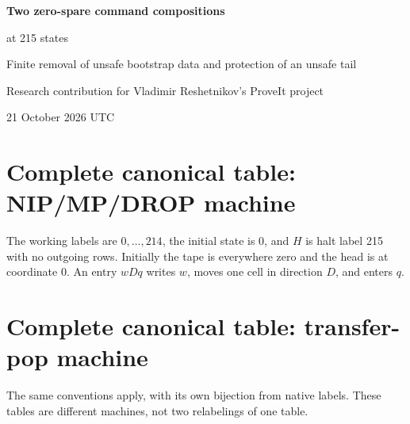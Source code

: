 \documentclass[11pt]{article}
\begin{document}
\begin{center}
{\LARGE\bfseries Two zero-spare command compositions\par at 215 states}\par\vspace{8pt}
{\large Finite removal of unsafe bootstrap data and protection of an unsafe tail}\par\vspace{5pt}
{Research contribution for Vladimir Reshetnikov's ProveIt project}\par
{21 October 2026 UTC}
\end{center}
\begin{abstract}
We construct two materially different binary, single-tape, blank-start machines with 215 working states. Neither is a 214-state result. Both combine the recently published zero-valued spare allocator with a different command language and a new initialization proof. The numerical calculus and its ZFC calibration are explicitly inherited.

The first machine uses command order NIP/MP/DROP. Its first complete source frame is \emph{unsafe}: finite initialization temporarily places the falsity code in both active theorem registers. Rather than asserting an invalid invariant there, we verify a further finite prefix. Failed numerical detachment removes the unsafe data, and after 570,263 binary transitions the machine reaches an ordinary safe root with next-candidate index 5 and additive counter 1. An arbitrary-counter calibration theorem then applies.

The second uses the three-command transfer-pop language. After 73,172 transitions it reaches a rigorously matched interior AX frame. Completing that AX leaves eight theorem heads above a generalization code not established to be a theorem. We do not call that code a theorem: an unbounded credit theorem bounds all future stack debt by three, permanently protecting the arbitrary suffix below at least five theorem heads. The two distinct initialization arguments are accompanied by full arbitrary-natural primitive runtime proofs and exact literal tables. These are ordinary mathematical proofs formalizable in ZFC, with executable certificates, not new Lean/Rocq kernel endpoints or claims of minimum state count.
\end{abstract}
\setcounter{tocdepth}{1}\tableofcontents





\clearpage\appendix
\section{Complete canonical table: NIP/MP/DROP machine}
The working labels are $0,\ldots,214$, the initial state is 0, and $H$ is halt label 215 with no outgoing rows. Initially the tape is everywhere zero and the head is at coordinate 0. An entry $wDq$ writes $w$, moves one cell in direction $D$, and enters $q$.

\clearpage
\section{Complete canonical table: transfer-pop machine}
The same conventions apply, with its own bijection from native labels. These tables are different machines, not two relabelings of one table.

\end{document}
